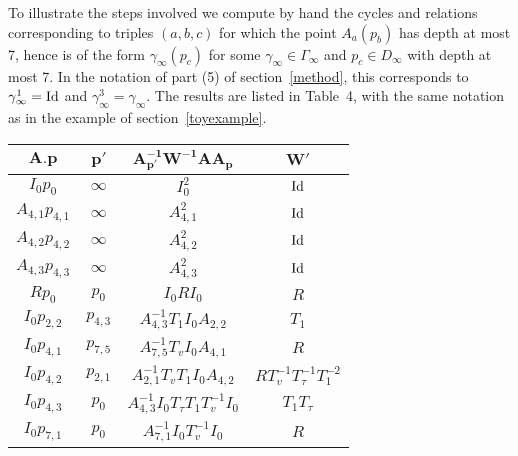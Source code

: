 \documentclass{article}[12pt]
\begin{document}
To illustrate the steps involved we compute by hand the cycles and relations corresponding to triples $(a,b,c)$ for which the point $A_a(p_b)$ has depth at most 7, hence is of the form $\gamma_\infty (p_c)$ for some $\gamma_\infty \in \Gamma_\infty$ and $p_c \in D_\infty$ with depth at most 7. In the notation of part (5) of section~\ref{method}, this corresponds to $\gamma_\infty^1={\rm Id}$ and  $\gamma_\infty^3=\gamma_\infty$. The results are listed in Table~4, with the same notation as in the example of section~\ref{toyexample}.


\begin{table}\label{d=7table1}
  \begin{center}
    \vspace{-1cm}
      {\renewcommand{\arraystretch}{1.2}%
\begin{tabular}{|c|c|c|c|}
  \hline
  
$\mathbf{A.p}$ & $\mathbf{p'}$ & $\mathbf{A_{p'}^{-1}W^{-1}A A_p}$ & $\mathbf{W'}$  \\
\hline

$I_0 p_0$ & $\infty$ & $I_0^2$ & ${\rm Id}$\\
\hline

$A_{4,1} p_{4,1}$ & $\infty$ & $A_{4,1}^2$ & ${\rm Id}$\\
\hline

$A_{4,2} p_{4,2}$ & $\infty$ & $A_{4,2}^2$ & ${\rm Id}$\\
\hline

$A_{4,3} p_{4,3}$ & $\infty$ & $A_{4,3}^2$ & ${\rm Id}$\\
\hline

$R p_0$ & $p_0$ & $I_0RI_0$ & $R$\\
\hline

$I_0 p_{2,2}$ & $p_{4,3}$ & $A_{4,3}^{-1}T_1I_0A_{2,2}$ & $T_1$\\
\hline

$I_0 p_{4,1}$ & $p_{7,5}$ & $A_{7,5}^{-1}T_vI_0A_{4,1}$ & $R$\\
\hline

$I_0 p_{4,2}$ & $p_{2,1}$ & $A_{2,1}^{-1}T_vT_1I_0A_{4,2}$  & $RT_v^{-1}T_\tau^{-1}T_1^{-2}$\\
\hline

$I_0 p_{4,3}$ & $p_0$ & $A_{4,3}^{-1}I_0T_\tau T_1T_v^{-1}I_0$ & $T_1T_\tau$\\
\hline

$I_0 p_{7,1}$ & $p_0$ & $A_{7,1}^{-1}I_0T_v^{-1}I_0$ & $R$\\
\hline


\end{tabular}}
\end{center}
\end{table}
\end{document}
